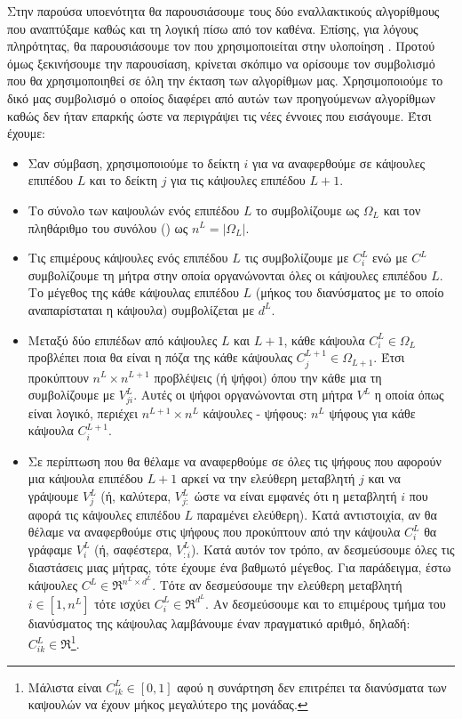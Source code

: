 Στην παρούσα υποενότητα θα παρουσιάσουμε τους δύο εναλλακτικούς αλγορίθμους που αναπτύξαμε καθώς και τη λογική πίσω από τον καθένα. Επίσης, για λόγους πληρότητας, θα παρουσιάσουμε τον  που χρησιμοποιείται στην υλοποίηση \cite{mazzia2021efficient}. Προτού όμως ξεκινήσουμε την παρουσίαση, κρίνεται σκόπιμο να ορίσουμε τον συμβολισμό που θα χρησιμοποιηθεί σε όλη την έκταση των αλγορίθμων μας. Χρησιμοποιούμε το δικό μας συμβολισμό ο οποίος διαφέρει από αυτών των προηγούμενων αλγορίθμων καθώς δεν ήταν επαρκής ώστε να περιγράψει τις νέες έννοιες που εισάγουμε. Έτσι έχουμε:
\begin{itemize}
  \item Σαν σύμβαση, χρησιμοποιούμε το δείκτη $i$ για να αναφερθούμε σε κάψουλες επιπέδου $L$ και το δείκτη $j$ για τις κάψουλες επιπέδου $L+1$.
  \item Το σύνολο των καψουλών ενός επιπέδου $L$ το συμβολίζουμε ως $\Omega_L$ και τον πληθάριθμο του συνόλου () ως $n^L = \left\lvert \Omega_L \right\rvert$.
  \item Τις επιμέρους κάψουλες ενός επιπέδου $L$ τις συμβολίζουμε με $C^L_i$ ενώ με $C^L$ συμβολίζουμε τη μήτρα στην οποία οργανώνονται όλες οι κάψουλες επιπέδου $L$. Το μέγεθος της κάθε κάψουλας επιπέδου $L$ (μήκος του διανύσματος με το οποίο αναπαρίσταται η κάψουλα) συμβολίζεται με $d^L$.
  \item Μεταξύ δύο επιπέδων από κάψουλες $L$ και $L+1$, κάθε κάψουλα $C^L_i \in \Omega_L$ προβλέπει ποια θα είναι η πόζα της κάθε κάψουλας $C^{L+1}_j \in \Omega_{L+1}$. Έτσι προκύπτουν $n^L \times n^{L+1}$ προβλέψεις (ή ψήφοι) όπου την κάθε μια τη συμβολίζουμε με $V_{ji}^L$. Αυτές οι ψήφοι οργανώνονται στη μήτρα $V^L$ η οποία όπως είναι λογικό, περιέχει $n^{L+1} \times n^L$ κάψουλες - ψήφους: $n^L$ ψήφους για κάθε κάψουλα $C^{L+1}_i$.
  \item Σε περίπτωση που θα θέλαμε να αναφερθούμε σε όλες τις ψήφους που αφορούν μια κάψουλα επιπέδου $L+1$ αρκεί να  την ελεύθερη μεταβλητή $j$ και να γράψουμε $V^L_j$ (ή, καλύτερα, $V^L_{j:}$ ώστε να είναι εμφανές ότι η μεταβλητή $i$ που αφορά τις κάψουλες επιπέδου $L$ παραμένει ελεύθερη). Κατά αντιστοιχία, αν θα θέλαμε να αναφερθούμε στις ψήφους που προκύπτουν από την κάψουλα $C^L_i$ θα γράφαμε $V^L_i$ (ή, σαφέστερα, $V^L_{:i}$). Κατά αυτόν τον τρόπο, αν δεσμεύσουμε όλες τις διαστάσεις μιας μήτρας, τότε έχουμε ένα βαθμωτό μέγεθος. Για παράδειγμα, έστω κάψουλες $C^L \in \Re^{n^L \times d^L}$. Τότε αν δεσμεύσουμε την ελεύθερη μεταβλητή $i \in [1, n^L]$ τότε ισχύει $C_i^L \in \Re^{d^L}$. Αν δεσμεύσουμε και το επιμέρους τμήμα του διανύσματος της κάψουλας λαμβάνουμε έναν πραγματικό αριθμό, δηλαδή: $C_{ik}^L \in \Re$\footnote{Μάλιστα είναι $C_{ik}^L \in [0,1]$ αφού η συνάρτηση  δεν επιτρέπει τα διανύσματα των καψουλών να έχουν μήκος μεγαλύτερο της μονάδας.}.

\end{itemize}
